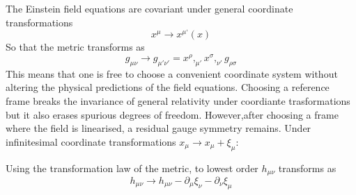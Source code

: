 \documentclass[binding=0.6cm, LaM]{sapthesis}
\begin{document}
The Einstein field equations are covariant under general coordinate transformations
\begin{equation}
x^{\mu} \rightarrow x^{\mu ‘}(x)
\end{equation}
So that the metric transforms as 
\begin{equation}
g_{\mu\nu} \rightarrow g_{\mu' \nu'} = x^{\rho},_{\mu'}x^{\sigma},_{\nu'}g_{\rho \sigma}
\end{equation}
This means that one is free to choose a convenient coordinate system without altering the physical predictions of the field equations. 
Choosing a reference frame breaks the invariance of general relativity under coordiante trasformations but it also erases spurious degrees of freedom.
However,after choosing a frame where the field is linearised, a residual gauge symmetry remains. Under infinitesimal coordinate transformations
 $x_{\mu} \rightarrow x_{\mu} + \xi_{\mu}$:

Using the transformation law of the metric, to lowest order $h_{\mu\nu}$ transforms as
\[
h_{\mu\nu} \rightarrow h_{\mu\nu} - \partial_{\mu}\xi_{\nu} - \partial_{\nu}\xi_{\mu}
\]
\end{document}
